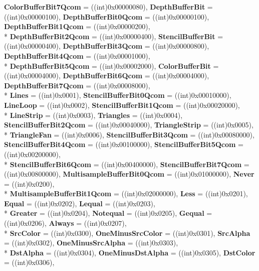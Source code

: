 \begin{DoxyCompactItemize}
{\bfseries Color\-Buffer\-Bit7\-Qcom} = ((int)0x00000080), 
{\bfseries Depth\-Buffer\-Bit} = ((int)0x00000100), 
{\bfseries Depth\-Buffer\-Bit0\-Qcom} = ((int)0x00000100), 
{\bfseries Depth\-Buffer\-Bit1\-Qcom} = ((int)0x00000200), 
\\*
{\bfseries Depth\-Buffer\-Bit2\-Qcom} = ((int)0x00000400), 
{\bfseries Stencil\-Buffer\-Bit} = ((int)0x00000400), 
{\bfseries Depth\-Buffer\-Bit3\-Qcom} = ((int)0x00000800), 
{\bfseries Depth\-Buffer\-Bit4\-Qcom} = ((int)0x00001000), 
\\*
{\bfseries Depth\-Buffer\-Bit5\-Qcom} = ((int)0x00002000), 
{\bfseries Color\-Buffer\-Bit} = ((int)0x00004000), 
{\bfseries Depth\-Buffer\-Bit6\-Qcom} = ((int)0x00004000), 
{\bfseries Depth\-Buffer\-Bit7\-Qcom} = ((int)0x00008000), 
\\*
{\bfseries Lines} = ((int)0x0001), 
{\bfseries Stencil\-Buffer\-Bit0\-Qcom} = ((int)0x00010000), 
{\bfseries Line\-Loop} = ((int)0x0002), 
{\bfseries Stencil\-Buffer\-Bit1\-Qcom} = ((int)0x00020000), 
\\*
{\bfseries Line\-Strip} = ((int)0x0003), 
{\bfseries Triangles} = ((int)0x0004), 
{\bfseries Stencil\-Buffer\-Bit2\-Qcom} = ((int)0x00040000), 
{\bfseries Triangle\-Strip} = ((int)0x0005), 
\\*
{\bfseries Triangle\-Fan} = ((int)0x0006), 
{\bfseries Stencil\-Buffer\-Bit3\-Qcom} = ((int)0x00080000), 
{\bfseries Stencil\-Buffer\-Bit4\-Qcom} = ((int)0x00100000), 
{\bfseries Stencil\-Buffer\-Bit5\-Qcom} = ((int)0x00200000), 
\\*
{\bfseries Stencil\-Buffer\-Bit6\-Qcom} = ((int)0x00400000), 
{\bfseries Stencil\-Buffer\-Bit7\-Qcom} = ((int)0x00800000), 
{\bfseries Multisample\-Buffer\-Bit0\-Qcom} = ((int)0x01000000), 
{\bfseries Never} = ((int)0x0200), 
\\*
{\bfseries Multisample\-Buffer\-Bit1\-Qcom} = ((int)0x02000000), 
{\bfseries Less} = ((int)0x0201), 
{\bfseries Equal} = ((int)0x0202), 
{\bfseries Lequal} = ((int)0x0203), 
\\*
{\bfseries Greater} = ((int)0x0204), 
{\bfseries Notequal} = ((int)0x0205), 
{\bfseries Gequal} = ((int)0x0206), 
{\bfseries Always} = ((int)0x0207), 
\\*
{\bfseries Src\-Color} = ((int)0x0300), 
{\bfseries One\-Minus\-Src\-Color} = ((int)0x0301), 
{\bfseries Src\-Alpha} = ((int)0x0302), 
{\bfseries One\-Minus\-Src\-Alpha} = ((int)0x0303), 
\\*
{\bfseries Dst\-Alpha} = ((int)0x0304), 
{\bfseries One\-Minus\-Dst\-Alpha} = ((int)0x0305), 
{\bfseries Dst\-Color} = ((int)0x0306), 

\end{DoxyCompactItemize}
